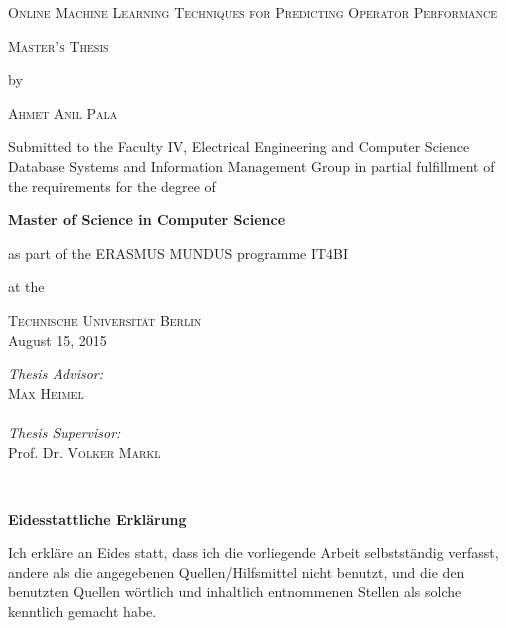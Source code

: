 \documentclass[11pt, a4paper, oneside]{Thesis} %
\begin{document}
\begin{titlepage}
\begin{center}
\vspace*{1.5cm}

\LARGE
\textsc{Online Machine Learning Techniques for Predicting Operator Performance}

\vspace{1cm}

\Large \textsc{Master's Thesis}

\vspace{0.2cm}

by

\vspace{0.4cm}


\textsc{Ahmet Anil Pala}

\vspace{1.0cm}

\vfill

\large 
Submitted to the Faculty IV, Electrical Engineering and Computer Science
Database Systems and Information Management Group
in partial fulfillment of the requirements for the degree of

\textbf{Master of Science in Computer Science}

as part of the ERASMUS MUNDUS programme IT4BI

at the 

\textsc{Technische Universit\"{a}t Berlin} \\

August 15, 2015

\vfill

\begin{flushright} 
\normalsize 
\emph{Thesis Advisor:}\\
\textsc{Max Heimel} \\

\ \\

\emph{Thesis Supervisor:}\\
Prof. Dr. \textsc{Volker Markl}\\
\end{flushright}


\end{center}
\end{titlepage}

\newpage

\ \\ 

\vspace{1.0cm}

\textbf{Eidesstattliche Erkl\"arung}

Ich erkl\"are an Eides statt, dass ich die vorliegende Arbeit selbstst\"andig 
verfasst, andere als die angegebenen Quellen/Hilfsmittel nicht benutzt, 
und die den benutzten Quellen w\"ortlich und inhaltlich entnommenen Stellen 
als solche kenntlich gemacht habe.
\end{document}
